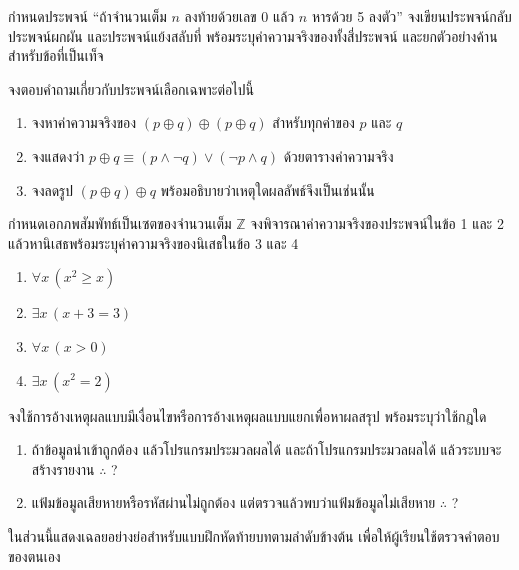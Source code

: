 \begin{exercise}
กำหนดประพจน์ ``ถ้าจำนวนเต็ม $n$ ลงท้ายด้วยเลข 0 แล้ว $n$ หารด้วย 5 ลงตัว'' จงเขียนประพจน์กลับ ประพจน์ผกผัน และประพจน์แย้งสลับที่ พร้อมระบุค่าความจริงของทั้งสี่ประพจน์ และยกตัวอย่างค้านสำหรับข้อที่เป็นเท็จ
\end{exercise}

\begin{exercise}
จงตอบคำถามเกี่ยวกับประพจน์เลือกเฉพาะต่อไปนี้
\begin{enumerate}
    \item จงหาค่าความจริงของ $(p \oplus q) \oplus (p \oplus q)$ สำหรับทุกค่าของ $p$ และ $q$
    \item จงแสดงว่า $p \oplus q \equiv (p \land \neg q) \lor (\neg p \land q)$ ด้วยตารางค่าความจริง
    \item จงลดรูป $(p \oplus q) \oplus q$ พร้อมอธิบายว่าเหตุใดผลลัพธ์จึงเป็นเช่นนั้น
\end{enumerate}
\end{exercise}

\begin{exercise}
กำหนดเอกภพสัมพัทธ์เป็นเซตของจำนวนเต็ม $\mathbb{Z}$ จงพิจารณาค่าความจริงของประพจน์ในข้อ 1 และ 2 แล้วหานิเสธพร้อมระบุค่าความจริงของนิเสธในข้อ 3 และ 4
\begin{enumerate}
    \item $\forall x\, (x^2 \geq x)$
    \item $\exists x\, (x + 3 = 3)$
    \item $\forall x\, (x > 0)$
    \item $\exists x\, (x^2 = 2)$
\end{enumerate}
\end{exercise}

\begin{exercise}
จงใช้การอ้างเหตุผลแบบมีเงื่อนไขหรือการอ้างเหตุผลแบบแยกเพื่อหาผลสรุป พร้อมระบุว่าใช้กฎใด
\begin{enumerate}
    \item ถ้าข้อมูลนำเข้าถูกต้อง แล้วโปรแกรมประมวลผลได้ และถ้าโปรแกรมประมวลผลได้ แล้วระบบจะสร้างรายงาน $\therefore$ ?
    \item แฟ้มข้อมูลเสียหายหรือรหัสผ่านไม่ถูกต้อง แต่ตรวจแล้วพบว่าแฟ้มข้อมูลไม่เสียหาย $\therefore$ ?
\end{enumerate}
\end{exercise}

\clearpage
\answerkeyhead
ในส่วนนี้แสดงเฉลยอย่างย่อสำหรับแบบฝึกหัดท้ายบทตามลำดับข้างต้น เพื่อให้ผู้เรียนใช้ตรวจคำตอบของตนเอง

